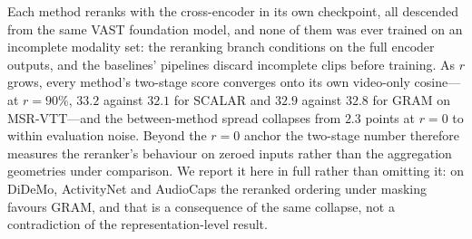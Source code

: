 \documentclass[10pt,twocolumn,letterpaper]{article}
\newcommand{\ours}{SCALAR}
\begin{document}
Each method reranks with the cross-encoder in its own checkpoint, all descended
from the same VAST foundation model, and none of them was ever trained on an
incomplete modality set: the reranking branch conditions on the full encoder
outputs, and the baselines' pipelines discard incomplete clips before training.
As $r$ grows, every method's two-stage score converges onto its own video-only
cosine---at $r{=}90\%$, $33.2$ against $32.1$ for \ours{} and $32.9$ against
$32.8$ for GRAM on MSR-VTT---and the between-method spread collapses from $2.3$
points at $r{=}0$ to within evaluation noise. Beyond the $r{=}0$ anchor the
two-stage number therefore measures the reranker's behaviour on zeroed inputs
rather than the aggregation geometries under comparison. We report it here in
full rather than omitting it: on DiDeMo, ActivityNet and AudioCaps the reranked
ordering under masking favours GRAM, and that is a consequence of the same
collapse, not a contradiction of the representation-level result.
\end{document}
